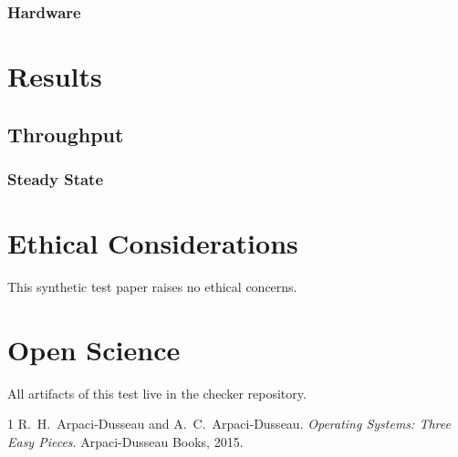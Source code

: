 \documentclass[letterpaper,twocolumn,10pt]{article}
\begin{document}
\subsubsection{Hardware}
\lipsum[7]

\setcounter{section}{9}
\section{Results}
\subsection{Throughput}
\subsubsection{Steady State}
\lipsum[8]

\appendix
\section*{Ethical Considerations}
This synthetic test paper raises no ethical concerns.

\section*{Open Science}
All artifacts of this test live in the checker repository.

\begin{thebibliography}{1}
 R.~H.\ Arpaci-Dusseau and A.~C.\ Arpaci-Dusseau.
  \emph{Operating Systems: Three Easy Pieces}. Arpaci-Dusseau Books, 2015.
\end{thebibliography}
\end{document}
